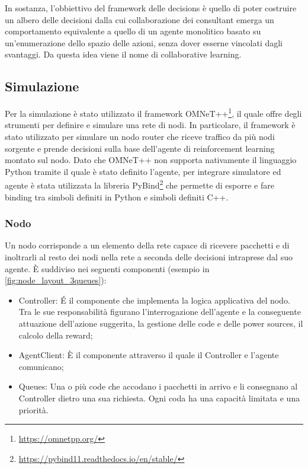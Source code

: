 \documentclass[conference]{IEEEtran}
\begin{document}
In sostanza, l'obbiettivo del framework delle decisions è quello di poter costruire un albero
delle decisioni dalla cui collaborazione dei consultant emerga un comportamento
equivalente a quello di un agente monolitico basato su un'enumerazione dello spazio
delle azioni, senza dover esserne vincolati dagli svantaggi. Da questa idea
viene il nome di collaborative learning.

\subsection{Simulazione}
Per la simulazione è stato utilizzato il framework OMNeT++\footnote{\href{https://omnetpp.org/}{https://omnetpp.org/}}, il quale offre degli strumenti per definire e simulare una rete di nodi. In particolare, il framework è stato utilizzato per simulare un nodo router che riceve traffico da più nodi sorgente e prende decisioni sulla base dell'agente di reinforcement learning montato sul nodo. Dato che OMNeT++ non supporta nativamente il linguaggio Python tramite il quale è stato definito l'agente, per integrare simulatore ed agente è stata utilizzata la libreria PyBind\footnote{\href{https://pybind11.readthedocs.io/en/stable/}{https://pybind11.readthedocs.io/en/stable/}} che permette di esporre e fare binding tra simboli definiti in Python e simboli definiti C++. 

\subsubsection{Nodo}
Un nodo corrisponde a un elemento della rete capace di ricevere pacchetti e di inoltrarli 
al resto dei nodi nella rete a seconda delle decisioni intraprese dal suo agente.
È suddiviso nei seguenti componenti (esempio in \autoref{fig:node_layout_3queues}):
\begin{itemize}
    \item Controller: É il componente che implementa la logica applicativa del nodo.
    Tra le sue responsabilità figurano l'interrogazione dell'agente e la conseguente
    attuazione dell'azione suggerita, la gestione delle code e delle power sources,
    il calcolo della reward;
    \item AgentClient: È il componente attraverso il quale il Controller e l'agente
    comunicano;
    \item Queues: Una o più code che accodano i pacchetti in arrivo e li consegnano
     al Controller
    dietro una sua richiesta. Ogni coda ha una capacità limitata e una priorità.
\end{itemize}
\end{document}

